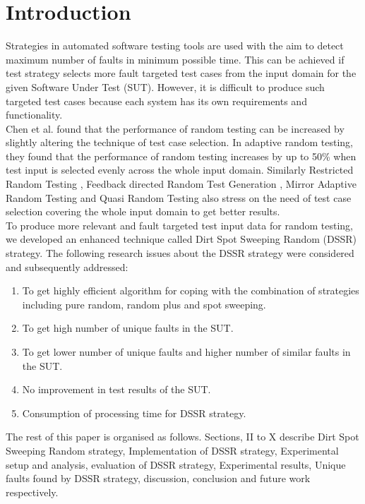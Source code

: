 \documentclass[conference]{IEEEtran}
\begin{document}
\section{Introduction}
Strategies in automated software testing tools are used with the aim to detect maximum number of faults in minimum possible time. This can be achieved if test strategy selects more fault targeted test cases from the input domain for the given Software Under Test (SUT). However, it is difficult to produce such targeted test cases because each system has its own requirements and functionality.\\
\indent Chen et al.  \cite{Chen2008} found that the performance of random testing can be increased by slightly altering the technique of test case selection. In adaptive random testing, they found that the performance of random testing increases by up to 50\% when test input is selected evenly across the whole input domain. Similarly Restricted Random Testing \cite{Chan2002}, Feedback directed Random Test Generation \cite{Pacheco2007a}, Mirror Adaptive Random Testing \cite{Chen2003} and Quasi Random Testing \cite{Chen2005} also stress on the need of test case selection covering the whole input domain to get better results. \\
\indent To produce more relevant and fault targeted test input data for random testing, we developed an enhanced technique called Dirt Spot Sweeping Random (DSSR) strategy.  The following research issues about the DSSR strategy were considered and subsequently addressed:
\begin{enumerate}

\item To get highly efficient algorithm for coping with the combination of strategies including pure random, random plus and spot sweeping.

\item To get high number of unique faults in the SUT. 

\item To get  lower number of unique faults and higher number of similar faults in the SUT.

\item  No improvement in test results of the SUT. 

\item  Consumption of processing time for DSSR strategy.

\end{enumerate}
The rest of this paper is organised as follows. Sections, II to X describe Dirt Spot Sweeping Random strategy, Implementation of DSSR strategy, Experimental setup and analysis, evaluation of DSSR strategy, Experimental results, Unique faults found by DSSR strategy, discussion, conclusion and future work respectively.
\end{document}

